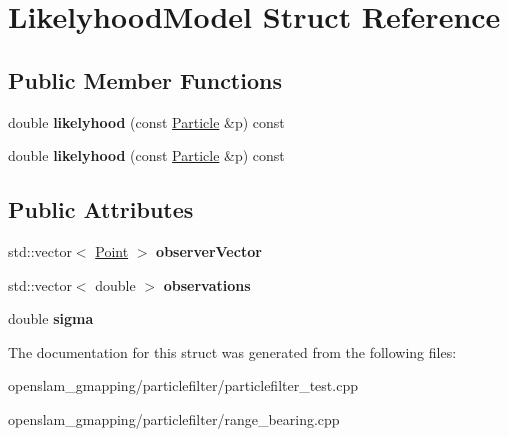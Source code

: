 \hypertarget{structLikelyhoodModel}{}\section{Likelyhood\+Model Struct Reference}
\label{structLikelyhoodModel}
\subsection*{Public Member Functions}
\begin{DoxyCompactItemize}
\item 
\mbox{\label{structLikelyhoodModel_ac3e84066fe1e113e4ea6ed0253238ff8}} 
double {\bfseries likelyhood} (const \hyperlink{structParticle}{Particle} \&p) const
\item 
\mbox{\label{structLikelyhoodModel_ac3e84066fe1e113e4ea6ed0253238ff8}} 
double {\bfseries likelyhood} (const \hyperlink{structParticle}{Particle} \&p) const
\end{DoxyCompactItemize}
\subsection*{Public Attributes}
\begin{DoxyCompactItemize}
\item 
\mbox{\label{structLikelyhoodModel_ace536c8f02f81c1c8c5417868e76350e}} 
std\+::vector$<$ \hyperlink{structGMapping_1_1point}{Point} $>$ {\bfseries observer\+Vector}
\item 
\mbox{\label{structLikelyhoodModel_af9e196b7f125dd939b10c70f472afe01}} 
std\+::vector$<$ double $>$ {\bfseries observations}
\item 
\mbox{\label{structLikelyhoodModel_aae9e9e91124abc66b088ef2ef86c5cdf}} 
double {\bfseries sigma}
\end{DoxyCompactItemize}


The documentation for this struct was generated from the following files\+:\begin{DoxyCompactItemize}
\item 
openslam\+\_\+gmapping/particlefilter/particlefilter\+\_\+test.\+cpp\item 
openslam\+\_\+gmapping/particlefilter/range\+\_\+bearing.\+cpp\end{DoxyCompactItemize}
